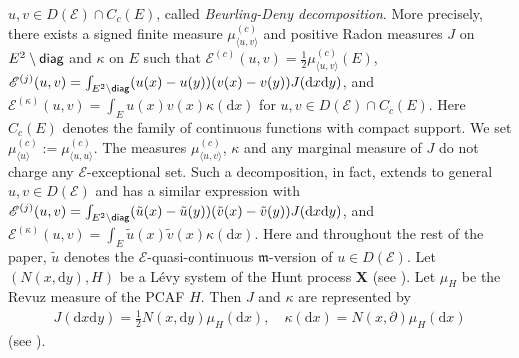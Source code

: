 \documentclass[12pt,a4paper]{article}
\renewcommand{\d}{\mathrm{d}}
\newcommand{\m}{\mathfrak{m} }
\newcommand{\1}{{\bf 1}}
\begin{document}
$u,v\in D(\mathscr{E})\cap C_c(E)$, called \emph{Beurling-Deny decomposition}.
More precisely, there exists a signed finite measure $\mu_{\langle u,v\rangle}^{(c)}$ and positive Radon measures $J$ on $E^2\setminus {\sf diag}$ and $\kappa$ on $E$ such that 
$\mathscr{E}^{(c)}(u,v)=\frac12\mu_{\langle u,v\rangle}^{(c)}(E)$, $\mathscr{E}^{(j)}(u,v)=
\int_{E^2\setminus{\sf diag}}( u (x)- u (y))(v(x)-v(y))J({\d} x{\d} y)$, and 
$\mathscr{E}^{(\kappa)}(u,v)=\int_E u (x) v(x)\kappa({\d} x)$ for $u,v\in D(\mathscr{E})\cap C_c(E)$. Here $C_c(E)$ denotes the family of continuous functions with compact support. 
We set $\mu_{\langle u\rangle}^{(c)}:=\mu_{\langle u,u\rangle}^{(c)}$. 
The measures $\mu_{\langle u,v\rangle}^{(c)}$, $\kappa$ and any marginal measure of $J$ do not charge any $\mathscr{E}$-exceptional set.
Such a decomposition, in fact, extends to general $u,v\in D(\mathscr{E})$ and has a similar expression with $\mathscr{E}^{(j)}(u,v)=
\int_{E^2\setminus{\sf diag}}(\tilde{u}(x)-\tilde{u}(y))(\tilde{v}(x)-\tilde{v}(y))J({\d} x{\d} y)$, and 
$\mathscr{E}^{(\kappa)}(u,v)=\int_E\tilde{u}(x)\tilde{v}(x)\kappa({\d} x)$.
Here and throughout the rest of the paper, $\tilde{u}$ denotes the $\mathscr{E}$-quasi-continuous ${\m}$-version of $u\in D(\mathscr{E})$.   
Let $(N(x,{\d} y), H)$ be a L\'evy system of the Hunt process {\bf X}  (see \cite[Theorem A.3.21]{FOT}).
Let $\mu_H$ be the Revuz measure of the PCAF $H$. 
Then $J$ and $\kappa$ are represented by 
\begin{align*}
J({\d} x{\d} y)=\frac12N(x,{\d} y)\mu_H({\d} x),\quad \kappa({\d} x)=N(x,\partial)\mu_H({\d} x)
\end{align*}
(see \cite[(5.3.6),(5.3.13)]{FOT}).
\end{document}
